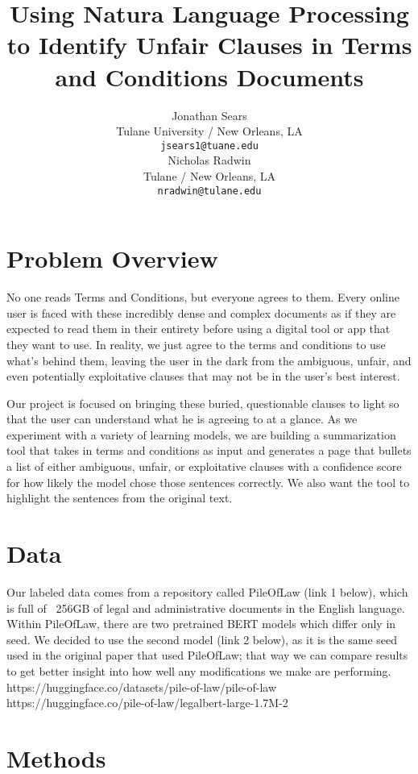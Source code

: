 \documentclass[11pt,a4paper]{article}
\title{Using Natura Language Processing to Identify Unfair Clauses in Terms and Conditions Documents}
\author{Jonathan Sears\\
  Tulane University / New Orleans, LA \\
  \texttt{jsears1@tuane.edu} \\\And
  Nicholas Radwin \\
  Tulane  / New Orleans, LA\\
  \texttt{nradwin@tulane.edu} \\}
\date{}
\begin{document}
\maketitle



\section{Problem Overview}

No one reads Terms and Conditions, but everyone agrees to them. Every online user is faced with these incredibly dense and complex documents as if they are expected to read them in their entirety before using a digital tool or app that they want to use. In reality, we just agree to the terms and conditions to use what's behind them, leaving the user in the dark from the ambiguous, unfair, and even potentially exploitative clauses that may not be in the user's best interest.

Our project is focused on bringing these buried, questionable clauses to light so that the user can understand what he is agreeing to at a glance. As we experiment with a variety of learning models, we are building a summarization tool that takes in terms and conditions as input and generates a page that bullets a list of either ambiguous, unfair, or exploitative clauses with a confidence score for how likely the model chose those sentences correctly. We also want the tool to highlight the sentences from the original text.

\section{Data}

Our labeled data comes from a repository called PileOfLaw (link 1 below), which is full of ~256GB of legal and administrative documents in the English language.
Within PileOfLaw, there are two pretrained BERT models which differ only in seed. We decided to use the second model (link 2 below), as it is the same seed used in the original paper that used PileOfLaw; that way we can compare results to get better insight into how well any modifications we make are performing.
https://huggingface.co/datasets/pile-of-law/pile-of-law
https://huggingface.co/pile-of-law/legalbert-large-1.7M-2


\section{Methods}
\end{document}
